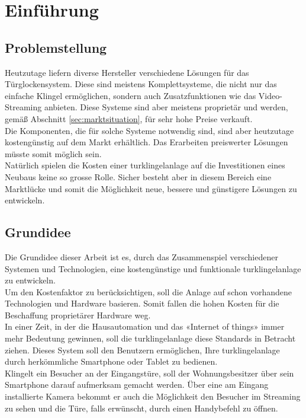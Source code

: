 \section{Einführung}
\label{sec:chapterexample}

\subsection{Problemstellung}
\label{sec:chapterexample}

Heutzutage liefern diverse Hersteller verschiedene Lösungen für das Türglockensystem. Diese sind meistens Komplettsysteme, die nicht nur das einfache Klingel ermöglichen, sondern auch Zusatzfunktionen wie das Video-Streaming anbieten. Diese Systeme sind aber meistens proprietär und werden, gemäß Abschnitt \ref{sec:marktsituation},  für sehr hohe Preise verkauft.
\\
Die Komponenten, die für solche Systeme notwendig sind, sind aber heutzutage kostengünstig auf dem Markt erhältlich. Das Erarbeiten preiswerter Lösungen müsste somit möglich sein.
\\
Natürlich spielen die Kosten einer \gls{turklingelanlage} auf die Investitionen eines Neubaus keine so grosse Rolle. Sicher besteht aber in diesem Bereich eine Marktlücke und somit die Möglichkeit neue, bessere und günstigere Lösungen zu entwickeln.

\subsection{Grundidee}
\label{sec:grundidee}
Die Grundidee dieser Arbeit ist es, durch das Zusammenspiel verschiedener Systemen und Technologien, eine kostengünstige und funktionale \gls{turklingelanlage} zu entwickeln.
\\ 
Um den Kostenfaktor zu berücksichtigen, soll die Anlage auf schon vorhandene Technologien und Hardware basieren. Somit fallen die hohen Kosten für die Beschaffung proprietärer Hardware weg.
\\
In einer Zeit, in der die Hausautomation und das «Internet of things» immer mehr Bedeutung gewinnen, soll die \gls{turklingelanlage} diese Standards in Betracht ziehen. Dieses System soll den Benutzern ermöglichen, Ihre \gls{turklingelanlage} durch herkömmliche Smartphone oder Tablet zu bedienen.
\\
Klingelt ein Besucher an der Eingangstüre, soll der Wohnungsbesitzer über sein Smartphone darauf aufmerksam gemacht werden. Über eine am Eingang installierte Kamera  bekommt er auch die Möglichkeit den Besucher im Streaming zu sehen und die Türe, falls erwünscht, durch einen Handybefehl zu öffnen.
\newpage
